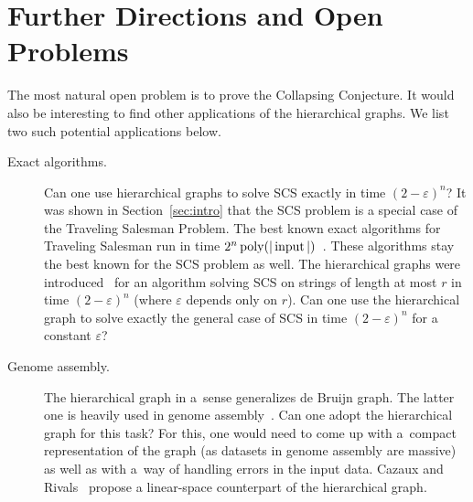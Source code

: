 \section{Further Directions and Open Problems}
The most natural open problem is to prove the Collapsing Conjecture.
It would also be interesting to find other applications of the 
hierarchical graphs. We list two such potential applications below.
\begin{description}
\item[Exact algorithms.] Can one use hierarchical graphs to solve SCS exactly in time $(2-\varepsilon)^n$?
It was shown in Section~\ref{sec:intro} that the SCS problem is a special case of the Traveling Salesman Problem. The best known exact algorithms for Traveling Salesman run in time $2^n \operatorname{poly}(|\operatorname{input}|)$~\cite{B1962, HK1971, KGK1977, K1982, BF1996}. These algorithms stay the best known for the SCS problem as well. The hierarchical graphs were introduced~\cite{scs_exact} for an algorithm solving SCS on strings of length at most $r$ in time $(2-\varepsilon)^n$ (where $\varepsilon$ depends only on $r$). Can one use the hierarchical graph to solve exactly the general case of SCS in time $(2-\varepsilon)^n$ for a constant $\varepsilon$?

\item[Genome assembly.] The hierarchical graph in a~sense
generalizes de Bruijn graph. The latter one is heavily used
in genome assembly~\cite{pevzner2001eulerian}.
Can one adopt the hierarchical graph for this task? For this, one
would need to come up with a~compact representation of the graph
(as datasets in genome assembly are massive) as well as with a~way of
handling errors in the input data. Cazaux and Rivals~\cite{cazaux2018hierarchical} propose a linear-space counterpart of the hierarchical graph.
\end{description}
